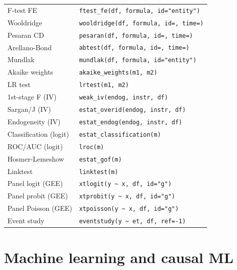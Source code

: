 \begin{center}
\begin{tabular}{ll}
F-test FE           & \texttt{ftest\_fe(df, formula, id="entity")} \\
Wooldridge          & \texttt{wooldridge(df, formula, id=, time=)} \\
Pesaran CD          & \texttt{pesaran(df, formula, id=, time=)} \\
Arellano-Bond       & \texttt{abtest(df, formula, id=, time=)} \\
Mundlak             & \texttt{mundlak(df, formula, id="entity")} \\
Akaike weights      & \texttt{akaike\_weights(m1, m2)} \\
LR test             & \texttt{lrtest(m1, m2)} \\
1st-stage F (IV)    & \texttt{weak\_iv(endog, instr, df)} \\
Sargan/J (IV)       & \texttt{estat\_overid(endog, instr, df)} \\
Endogeneity (IV)    & \texttt{estat\_endog(endog, instr, df)} \\
Classification (logit) & \texttt{estat\_classification(m)} \\
ROC/AUC (logit)     & \texttt{lroc(m)} \\
Hosmer-Lemeshow     & \texttt{estat\_gof(m)} \\
Linktest            & \texttt{linktest(m)} \\
Panel logit (GEE)   & \texttt{xtlogit(y \textasciitilde{} x, df, id="g")} \\
Panel probit (GEE)  & \texttt{xtprobit(y \textasciitilde{} x, df, id="g")} \\
Panel Poisson (GEE) & \texttt{xtpoisson(y \textasciitilde{} x, df, id="g")} \\
Event study         & \texttt{eventstudy(y \textasciitilde{} et, df, ref=-1)} \\
\bottomrule
\end{tabular}
\end{center}

\section{Machine learning and causal ML}

